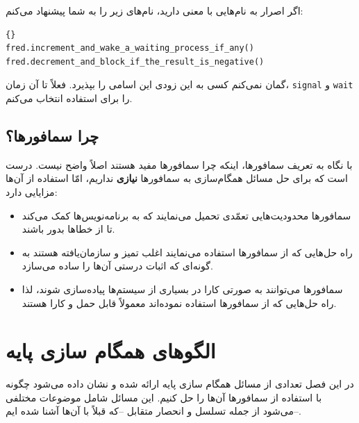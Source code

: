\documentclass{book}
\newcommand{\clearemptydoublepage}{\newpage\cleardoublepage}
\begin{document}
    اگر اصرار به نام‌هایی با معنی دارید، نام‌های زیر را به شما پیشنهاد می‌کنم:
    

\begin{latin}
\begin{lstlisting}[title=\rl{اعمال سمافور}]{}
fred.increment_and_wake_a_waiting_process_if_any()
fred.decrement_and_block_if_the_result_is_negative()	
\end{lstlisting}
\end{latin}

    گمان نمی‌کنم کسی به این زود‌ی این اسامی را بپذیرد. فعلاً تا آن زمان، \texttt{signal} و \texttt{wait}
     را برای استفاده انتخاب می‌کنم.
    

\section{چرا سمافورها؟}

    با نگاه به تعریف سمافورها، اینکه چرا سمافورها مفید هستند اصلاً واضح نیست. 
    درست است که برای حل مسائل همگام‌سازی به سمافورها \textbf{نیازی} نداریم، امّا استفاده از آن‌ها مزایایی دارد:

\begin{itemize}

\item 
    سمافورها محدودیت‌هایی تعمّدی تحمیل می‌نمایند که به برنامه‌نویس‌ها کمک می‌کند تا از خطاها بدور باشند. 

\item 
    راه حل‌هایی که از سمافورها استفاده می‌نمایند اغلب تمیز و سازمان‌یافته هستند به گونه‌ای که اثبات درستی آن‌ها را ساده می‌سازد. 

\item 
    سمافورها می‌توانند به صورتی کارا در بسیاری از سیستم‌ها پیاده‌سازی شوند، لذا راه حل‌هایی که از سمافورها استفاده نموده‌اند معمولاً قابل حمل 
    و کارا هستند. 
\end{itemize}

\clearemptydoublepage

\chapter{الگوهای همگام سازی پایه}

در این فصل تعدادی از مسائل همگام سازی پایه ارائه شده و نشان داده می‌شود چگونه با استفاده از سمافورها آن‌ها را حل کنیم. این مسائل شامل موضوعات مختلفی می‌شود از جمله تسلسل و انحصار متقابل --که قبلاً با آن‌ها آشنا شده ایم--.
\end{document}
